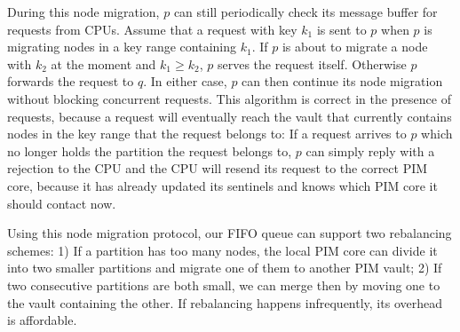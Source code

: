 During this node migration, $p$ can still periodically check its message buffer for requests from CPUs.
Assume that a request with key $k_1$ is sent to $p$ when $p$ is migrating nodes 
in a key range containing $k_1$.  
If $p$ is about to migrate a node with $k_2$ at the moment and $k_1 \ge k_2$, 
$p$ serves the request itself. 
Otherwise $p$ forwards the request to $q$. 
In either case, $p$ can then continue its node migration without blocking concurrent requests. 
This algorithm is correct in the presence of requests, because 
a request will eventually reach the vault that 
currently contains nodes in the key range that the request belongs to: 
If a request arrives to $p$ which no longer holds the partition the request belongs to, 
$p$ can simply reply with a rejection to the CPU and the CPU will resend its request to 
the correct PIM core, 
because it has already updated its sentinels and knows which PIM core it should contact now. 

Using this node migration protocol, our FIFO queue can support two rebalancing schemes:
1) If a partition has too many nodes, the local PIM core can divide it into two smaller  
partitions and migrate one of them to another PIM vault; 
2) If two consecutive partitions are both small, 
we can merge then by moving one to the vault containing the other. 
If rebalancing happens infrequently, its overhead is affordable. 

